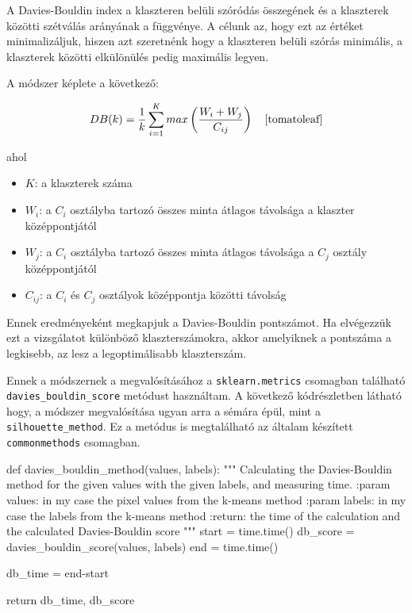 A Davies-Bouldin index a klaszteren belüli szóródás összegének és a klaszterek közötti szétválás arányának a függvénye. A célunk az, hogy ezt az értéket minimalizáljuk, hiszen azt szeretnénk hogy a klaszteren belüli szórás minimális, a klaszterek közötti elkülönülés pedig maximális legyen.

A módszer képlete a következő:

\[ DB(k)=\frac{1}{k} \sum_{i=1}^{K} max \left(\frac{W_i + W_j}{C_{ij}}\right)  \quad \cite{tomatoleaf} \]

ahol
\begin{itemize}
\item $K$: a klaszterek száma
\item $W_i$: a $C_i$ osztályba tartozó összes minta átlagos távolsága a klaszter középpontjától
\item $W_{j}$: a $C_i$ osztályba tartozó összes minta átlagos távolsága a $C_j$ osztály középpontjától 
\item $C_{ij}$: a $C_i$ és $C_j$ osztályok középpontja közötti távolság
\end{itemize}
Ennek eredményeként megkapjuk a Davies-Bouldin pontszámot. Ha elvégezzük ezt a vizsgálatot különböző klaszterszámokra, akkor amelyiknek a pontszáma a legkisebb, az lesz a legoptimálisabb klaszterszám.

Ennek a módszernek a megvalósításához a \texttt{sklearn.metrics} csomagban található \texttt{davies\_bouldin\_score} metódust használtam. A következő kódrészletben látható hogy, a módszer megvalósítása ugyan arra a sémára épül, mint a \texttt{silhouette\_method}. Ez a metódus is megtalálható az általam készített \texttt{commonmethods} csomagban.
\begin{python}
def davies_bouldin_method(values, labels):
    """
    Calculating the Davies-Bouldin method for the given values with
    the given labels, and measuring time.
    :param values: in my case the pixel values from the k-means method
    :param labels: in my case the labels from the k-means method
    :return: the time of the calculation and
        the calculated Davies-Bouldin score
    """
    start = time.time()
    db_score = davies_bouldin_score(values, labels)
    end = time.time()

    db_time = end-start

    return db_time, db_score
\end{python}


